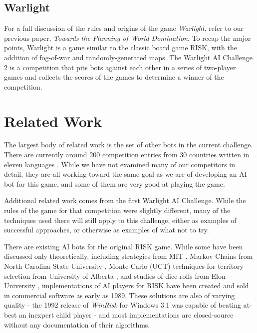 \documentclass[a4paper,11pt]{article}
\begin{document}
\subsection{Warlight} \label{sec:warlight}
For a full discussion of the rules and origins of the game \emph{Warlight}, refer
to our previous paper, \emph{Towards the Planning of World Domination}\cite{ourproposal}.
To recap the major points, Warlight is a game similar to the classic board game RISK, with the addition of fog-of-war and randomly-generated maps. The Warlight AI Challenge 2 is a competition that pits bots against each other in a series of two-player games and collects the scores of the games to determine a winner of the competition.

\section{Related Work}\label{sec:previous}
The largest body of related work is the set of other bots in the current challenge.  
There are currently around 200 competition entries from 30 countries written in 
eleven languages \cite{warlight}.  While we have not examined many of our competitors 
in detail, they are all working toward the same goal as we are of developing an AI bot for 
this game, and some of them are very good at playing the game.

Additional related work comes from the first Warlight AI Challenge.  While the 
rules of the game for that competition were slightly different, many of the 
techniques used there will still apply to this challenge, either as examples of 
successful approaches, or otherwise as examples of what not to try.

There are existing AI bots for the original RISK game.  While some have been 
discussed only theoretically, including strategies from MIT \cite{riskmit}, Markov 
Chains from North Carolina State University \cite{riskncs}, Monte-Carlo (UCT) 
techniques for territory selection from University of Alberta \cite{riskalb}, and 
studies of dice-rolls from Elon University \cite{riskelon}, implementations of AI 
players for RISK have been created and sold in commercial software as early as 1989. 
These solutions are also of varying quality - the 1992 release of \textit{WinRisk} for 
Windows 3.1 was capable of beating at-best an inexpert child player - and most 
implementations are closed-source without any documentation of their algorithms.
\end{document}
